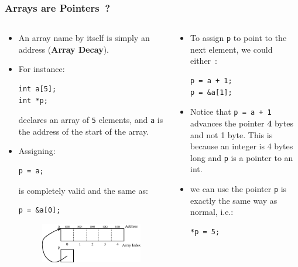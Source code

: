 

\begin{frame}[fragile]
\frametitle{Arrays are Pointers~?}
\begin{columns}[T]

\begin{column}{0.45\textwidth}
\begin{itemize}[<+->]
\item An array name by itself is simply an address
({\bf Array Decay}).

\item 
For instance:
\begin{verbatim}
int a[5];
int *p;
\end{verbatim}
declares an array of \verb^5^ elements, and
\verb^a^ is the address of the start of the
array.
\item
Assigning:
\begin{verbatim}
p = a;
\end{verbatim}
is completely valid and
the same as:
\begin{verbatim}
p = &a[0];
\end{verbatim}
\begin{center}
\begin{figure}[ht]
\centerline{
\includegraphics[scale=0.25]{../Figs/array9_2.eps}
}
\end{figure}
\end{center}
\end{itemize}
\end{column}


\pause
\begin{column}{0.45\textwidth}
\begin{itemize}[<+->]
\item To assign \verb^p^ to point to the next element,
we could either~:
\begin{verbatim}
p = a + 1;
p = &a[1];
\end{verbatim}
\item Notice that \verb^p = a + 1^ advances
the pointer {\bf 4} bytes and not 1 byte.
This is because an integer is 4 bytes long and
\verb^p^ is a pointer to an int.
\item we can use the pointer \verb^p^ is exactly
the same way as normal, i.e.:
\begin{verbatim}
*p = 5;
\end{verbatim}
\end{itemize}
\end{column}

\end{columns}
\end{frame}

